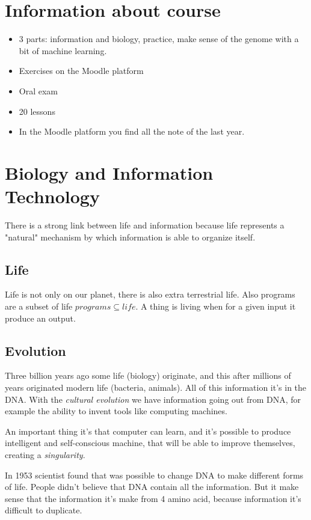 \section{Information about course}

\begin{itemize}
  \item 3 parts: information and biology, practice, make sense of the genome
with a bit of machine learning.
  \item Exercises on the Moodle platform
  \item Oral exam
  \item 20 lessons
  \item In the Moodle platform you find all the note of the last year.
\end{itemize}

\section{Biology and Information Technology}

There is a strong link between life and information because life represents a
"natural" mechanism by which information is able to organize itself.

\subsection{Life}
Life is not only on our planet, there is also extra terrestrial life.
Also programs are a subset of life $programs \subseteq life$. A thing is living
when for a given input it produce an output.

\subsection{Evolution}

Three billion years ago some life (biology) originate, and this after millions
of years originated modern life (bacteria, animals). All of this information
it's in the DNA. With the \textit{cultural evolution} we have information going
out from DNA, for example the ability to invent tools like computing machines.

An important thing it's that computer can learn, and it's possible to produce
intelligent and self-conscious machine, that will be able to improve themselves,
creating a \textit{singularity}.

In 1953 scientist found that was possible to change DNA to make different forms
of life. People didn't believe that DNA contain all the information.
But it make sense that the information it's make from 4 amino acid, because
information it's difficult to duplicate.

